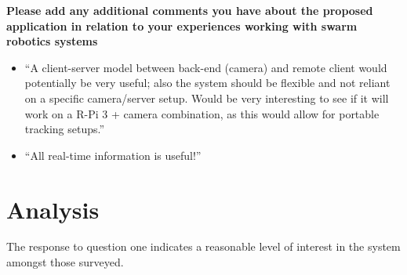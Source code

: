 \vspace{1cm}

\textbf{Please add any additional comments you have about the proposed application in relation to your experiences working with swarm robotics systems}

\begin{itemize}
\item ``A client-server model between back-end (camera) and remote client would potentially be very useful; also the system should be flexible and not reliant on a specific camera/server setup. Would be very interesting to see if it will work on a R-Pi 3 + camera combination, as this would allow for portable tracking setups.''
\item ``All real-time information is useful!''
\end{itemize}


\section{Analysis}
The response to question one indicates a reasonable level of interest in the system amongst those surveyed. 

